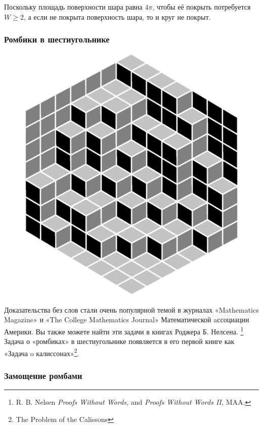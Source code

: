 Поскольку площадь поверхности шара равна $4\pi$, чтобы её покрыть потребуется $W\ge 2$,
а если не покрыта поверхность шара, то и круг не покрыт.

\subsubsection*{Ромбики в шестиугольнике}%

\begin{figure}[h!]
\centering
\includegraphics[scale=0.5]{Figs/Geometry/diamonds}
\end{figure}
\heart

Доказательства без слов стали очень популярной темой в журналах «Mathematics Magazine» и «The College Mathematics Journal» Математической aссоциации Америки.
Вы также можете найти эти задачи в книгах Роджера Б. Нелсена.%
\footnote{R. B. Nelsen \emph{Proofs Without Words,} and \emph{Proofs Without Words II,} MAA.}
Задача о «ромбиках» в шестиугольнике появляется в его первой книге как «Задача o калиссонах»\footnote{The Problem of the Calissons}.

\subsubsection*{Замощение ромбами}%

